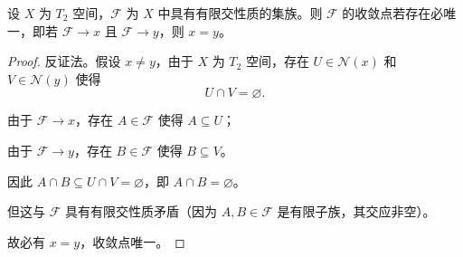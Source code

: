 \documentclass[lang=cn,a4paper,newtx,figureplace=section,tableplace=section]{elegantbook}
\begin{document}
\begin{proposition}\label{prop:finite-intersection-unique-limit}
设 $X$ 为 $T_2$ 空间，$\mathcal{F}$ 为 $X$ 中具有有限交性质的集族。则 $\mathcal{F}$ 的收敛点若存在必唯一，即若 $\mathcal{F} \to x$ 且 $\mathcal{F} \to y$，则 $x = y$。
\end{proposition}
\begin{proof}
反证法。假设 $x \neq y$，由于 $X$ 为 $T_2$ 空间，存在 $U \in \mathcal{N}(x)$ 和 $V \in \mathcal{N}(y)$ 使得
\begin{equation}
U \cap V = \varnothing.
\end{equation}

由于 $\mathcal{F} \to x$，存在 $A \in \mathcal{F}$ 使得 $A \subseteq U$；

由于 $\mathcal{F} \to y$，存在 $B \in \mathcal{F}$ 使得 $B \subseteq V$。

因此 $A \cap B \subseteq U \cap V = \varnothing$，即 $A \cap B = \varnothing$。

但这与 $\mathcal{F}$ 具有有限交性质矛盾（因为 $A, B \in \mathcal{F}$ 是有限子族，其交应非空）。

故必有 $x = y$，收敛点唯一。
\end{proof}
\end{document}
